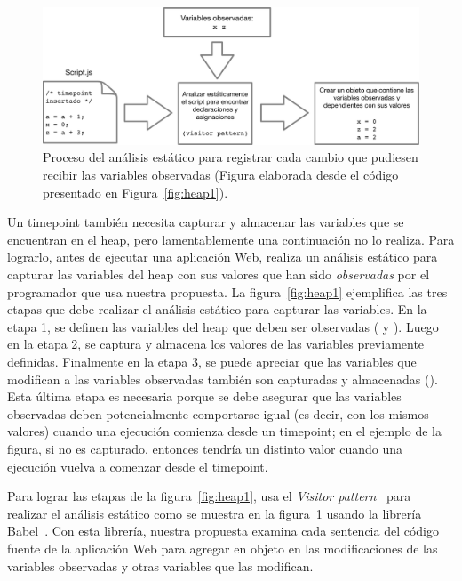 \documentclass[conference]{IEEEtran}
\begin{document}
\begin{figure}[t]
\begin{center}
\includegraphics[width=.95\linewidth]{fig-heap2}
\caption{Proceso del an\'alisis est\'atico para registrar cada cambio que pudiesen recibir las variables observadas (Figura elaborada desde el c\'odigo presentado en Figura~\ref{fig:heap1}).}
\label{fig:heap2}
\end{center}
\end{figure}

Un timepoint tambi\'en necesita capturar y almacenar las variables que se encuentran en el heap, pero lamentablemente una continuaci\'on no lo realiza. Para lograrlo, antes de ejecutar una aplicaci\'on Web, \deloreanjs realiza un an\'alisis est\'atico para capturar las variables del heap con sus valores que han sido {\em observadas} por el programador que usa nuestra propuesta. La figura~\ref{fig:heap1} ejemplifica las tres etapas que debe realizar el an\'alisis est\'atico para capturar las variables. En la etapa 1, se definen las variables del heap que deben ser observadas ( y ). Luego en la etapa 2, se captura y almacena los valores de las variables previamente definidas. Finalmente en la etapa 3, se puede apreciar que las variables que modifican a las variables observadas tambi\'en son capturadas y almacenadas (). Esta \'ultima etapa es necesaria porque se debe asegurar que las variables observadas deben potencialmente comportarse igual (es decir, con los mismos valores) cuando una ejecuci\'on comienza desde un timepoint; en el ejemplo de la figura, si  no es capturado, entonces  tendr\'ia un distinto valor cuando una ejecuci\'on vuelva a comenzar desde el timepoint.          

Para lograr las etapas de la figura~\ref{fig:heap1}, \deloreanjs usa el {\em Visitor pattern}~\cite{GoF94} para realizar el an\'alisis est\'atico como se muestra en la figura~\ref{fig:heap2} usando la librer\'ia Babel~\cite{mckenzie:babel}. Con esta librer\'ia, nuestra propuesta examina cada sentencia del c\'odigo fuente de la aplicaci\'on Web para agregar en objeto en \javascript las modificaciones de las variables observadas y otras variables que las modifican.
\end{document}
